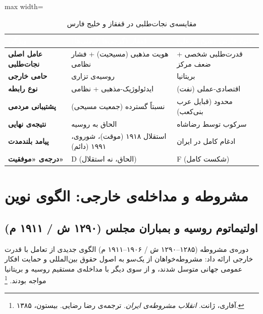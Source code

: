 \begin{table}[htbp]
\centering
\caption{مقایسه‌ی نجات‌طلبی در قفقاز و خلیج فارس}\label{tab:ch06-comparison}
\begin{adjustbox}{max width=\linewidth}
\begin{tabular}{
  >{\raggedleft\arraybackslash\bfseries}p{3cm}
  >{\raggedleft\arraybackslash}p{5cm}
  >{\raggedleft\arraybackslash}p{5cm}}
\toprule
\rowcolor{PrimaryDeep}
\textcolor{white}{ویژگی} &
\textcolor{white}{قفقاز (گرجی‌ها/ارمنی‌ها)} &
\textcolor{white}{خلیج فارس (شیخ خزعل)} \\
\midrule

عامل اصلی نجات‌طلبی &
هویت مذهبی (مسیحیت) + فشار نظامی &
قدرت‌طلبی شخصی + ضعف مرکز \\
\rowcolor{NeutralLight}
حامی خارجی &
روسیه‌ی تزاری &
بریتانیا \\
نوع رابطه &
ایدئولوژیک-مذهبی + نظامی &
اقتصادی-عملی (نفت) \\
\rowcolor{NeutralLight}
پشتیبانی مردمی &
نسبتاً گسترده (جمعیت مسیحی) &
محدود (قبایل عرب بنی‌کعب) \\
نتیجه‌ی نهایی &
الحاق به روسیه &
سرکوب توسط رضاشاه \\
\rowcolor{NeutralLight}
پیامد بلندمدت &
استقلال ۱۹۱۸ (موقت)، شوروی، ۱۹۹۱ (دائم) &
ادغام کامل در ایران \\
درجه‌ی «موفقیت» &
D (الحاق، نه استقلال) &
F (شکست کامل) \\

\bottomrule
\end{tabular}
\end{adjustbox}
\end{table}

\section{مشروطه و مداخله‌ی خارجی: الگوی نوین}
\label{sec:ch06-constitutional}

\subsection{اولتیماتوم روسیه و بمباران مجلس (۱۲۹۰ ش / ۱۹۱۱ م)}
\label{subsec:ch06-ultimatum}

دوره‌ی مشروطه (۱۲۸۵–۱۲۹۰ ش / ۱۹۰۶–۱۹۱۱ م) الگوی جدیدی از تعامل با قدرت خارجی ارائه داد: مشروطه‌خواهان از یک‌سو به اصول حقوق بین‌المللی و حمایت افکار عمومی جهانی متوسل شدند، و از سوی دیگر با مداخله‌ی مستقیم روسیه و بریتانیا مواجه بودند.%
\footnote{آفاری، ژانت. \textit{انقلاب مشروطه‌ی ایران}. ترجمه‌ی رضا رضایی. بیستون، ۱۳۸۵.}


